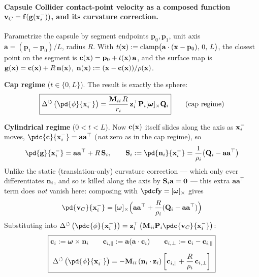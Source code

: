\begin{derivation}
\paragraph{Capsule Collider contact-point velocity as a composed function $\mathbf{v}_C = \mathbf{f}(\mathbf{g}(\mathbf{x}_i^-))$, and its curvature correction.} \mbox{}\par\medskip

\begin{reminder}
Parametrize the capsule by segment endpoints $\mathbf p_0,\mathbf p_1$, unit axis $\mathbf a = (\mathbf p_1-\mathbf p_0)/L$, radius $R$.
With $t(\mathbf{x}) := \mathrm{clamp}\big(\mathbf a\cdot(\mathbf{x}-\mathbf p_0),\,0,\,L\big)$, the closest point on the segment is
$\mathbf c(\mathbf{x}) = \mathbf p_0 + t(\mathbf{x})\,\mathbf a$, and the surface map is $\mathbf{g}(\mathbf{x}) = \mathbf c(\mathbf{x}) + R\,\mathbf{n}(\mathbf{x})$,
$\mathbf{n}(\mathbf{x}) := (\mathbf{x}-\mathbf c(\mathbf{x}))/\rho(\mathbf{x})$.
\end{reminder}

\textbf{Cap regime} ($t\in\{0,L\}$). 
The result is exactly the sphere:
\begin{equation}
    \boxed{
    \Delta^\circlearrowleft\left(\pd{\phi}{\x_i^-}\right) = \frac{\M_{ii}\,R}{r_i}\,\z_i^\top\mathbf{P}_i[\boldsymbol\omega]_\times\mathbf{Q}_i
    }
    \qquad \text{(cap regime)}
\end{equation}

\textbf{Cylindrical regime} ($0<t<L$). Now $\mathbf c(\mathbf{x})$ itself slides
along the axis as $\mathbf{x}_i^-$ moves, $\pdc{\mathbf c}{\x_i^-} = \mathbf a\mathbf a^\top$ (\emph{not} zero as in
the cap regime), so
\begin{equation*}
    \pd{\g}{\x_i^-} = \mathbf a\mathbf a^\top + R\,\mathbf S_i, \qquad
    \mathbf S_i := \pd{\n_i}{\x_i^-} = \frac{1}{\rho_i}\big(\mathbf{Q}_i-\mathbf a\mathbf a^\top\big)
\end{equation*}
Unlike the static (translation-only) curvature correction — which only ever differentiates $\mathbf{n}_i$, and
so is killed along the axis by $\mathbf S_i\mathbf a=\mathbf{0}$ — this extra $\mathbf a\mathbf a^\top$ term
does \emph{not} vanish here: composing with $\pdc\f{\mathbf y}=[\boldsymbol\omega]_\times$ gives
\begin{equation*}
    \pd{\vv_C}{\x_i^-} = [\boldsymbol\omega]_\times\Big(\mathbf a\mathbf a^\top + \frac{R}{\rho_i}(\mathbf{Q}_i-\mathbf a\mathbf a^\top)\Big)
\end{equation*}
Substituting into $\Delta^\circlearrowleft\left(\pdc{\phi}{\x_i^-}\right) = \z_i^\top\left(\M_{ii}\mathbf{P}_i\pdc{\vv_C}{\x_i^-}\right)$:
\begin{gather}
\boxed{
\begin{gathered}
\mathbf c_i := \boldsymbol\omega\times\n_i \qquad
\mathbf c_{i,\parallel} := \mathbf a(\mathbf a\cdot\mathbf c_i) \qquad
\mathbf c_{i,\perp} := \mathbf c_i-\mathbf c_{i,\parallel}
\\[6pt]
\Delta^\circlearrowleft\left(\pd{\phi}{\x_i^-}\right) = -\M_{ii}\,(\n_i\cdot\z_i) \left[ \mathbf c_{i,\parallel} + \frac{R}{\rho_i}\,\mathbf c_{i,\perp} \right]
\end{gathered}
}
\end{gather}
\end{derivation}

